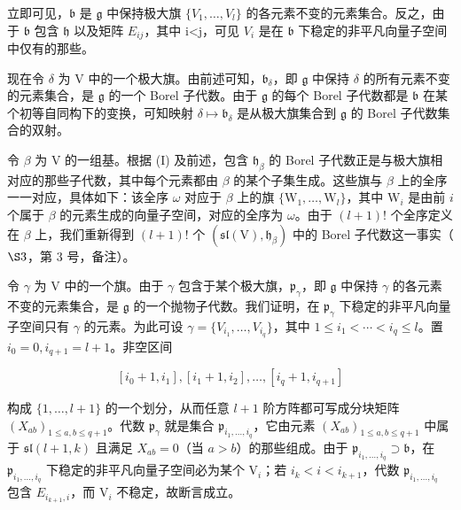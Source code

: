 立即可见，\(\mathfrak{b}\) 是 \(\mathfrak{g}\) 中保持极大旗 \(\{V_{1},\ldots,V_{l}\}\) 的各元素不变的元素集合。反之，由于 \(\mathfrak{b}\) 包含 \(\mathfrak{h}\) 以及矩阵 \(E_{ij}\)，其中 i\textless j，可见 \(V_{i}\) 是在 \(\mathfrak{b}\) 下稳定的非平凡向量子空间中仅有的那些。

现在令 \(\delta\) 为 V 中的一个极大旗。由前述可知，\(\mathfrak{b}_{\delta}\)，即 \(\mathfrak{g}\) 中保持 \(\delta\) 的所有元素不变的元素集合，是 \(\mathfrak{g}\) 的一个 Borel 子代数。由于 \(\mathfrak{g}\) 的每个 Borel 子代数都是 \(\mathfrak{b}\) 在某个初等自同构下的变换，可知映射 \(\delta \mapsto \mathfrak{b}_{\delta}\) 是从极大旗集合到 \(\mathfrak{g}\) 的 Borel 子代数集合的双射。

令 \(\beta\) 为 V 的一组基。根据 (I) 及前述，包含 \(\mathfrak{h}_{\beta}\) 的 Borel 子代数正是与极大旗相对应的那些子代数，其中每个元素都由 \(\beta\) 的某个子集生成。这些旗与 \(\beta\) 上的全序一一对应，具体如下：该全序 \(\omega\) 对应于 \(\beta\) 上的旗 \(\{\mathrm{W}_1,\dots ,\mathrm{W}_l\}\)，其中 \(\mathrm{W}_i\) 是由前 \(i\) 个属于 \(\beta\) 的元素生成的向量子空间，对应的全序为 \(\omega\)。由于 \((l + 1)!\) 个全序定义在 \(\beta\) 上，我们重新得到 \((l + 1)!\) 个 \((\mathfrak{sl}(\mathrm{V}),\mathfrak{h}_{\beta})\) 中的 Borel 子代数这一事实（\(\S 3\)，第 3 号，备注）。

令 \(\gamma\) 为 V 中的一个旗。由于 \(\gamma\) 包含于某个极大旗，\(\mathfrak{p}_{\gamma}\)，即 \(\mathfrak{g}\) 中保持 \(\gamma\) 的各元素不变的元素集合，是 \(\mathfrak{g}\) 的一个抛物子代数。我们证明，在 \(\mathfrak{p}_{\gamma}\) 下稳定的非平凡向量子空间只有 \(\gamma\) 的元素。为此可设 \(\gamma = \{V_{i_1}, \ldots, V_{i_q}\}\)，其中 \(1 \leq i_1 < \cdots < i_q \leq l\)。置 \(i_0 = 0, i_{q+1} = l + 1\)。非空区间

\[
\left[ i _ {0} + 1, i _ {1} \right], \left[ i _ {1} + 1, i _ {2} \right], \dots , \left[ i _ {q} + 1, i _ {q + 1} \right]
\]

构成 \(\{1, \ldots, l + 1\}\) 的一个划分，从而任意 \(l + 1\) 阶方阵都可写成分块矩阵 \((X_{ab})_{1 \leq a, b \leq q + 1}\)。代数 \(\mathfrak{p}_{\gamma}\) 就是集合 \(\mathfrak{p}_{i_1,\dots,i_q}\)，它由元素 \((X_{ab})_{1\leq a,b\leq q + 1}\) 中属于 \(\mathfrak{sl}(l + 1,k)\) 且满足 \(X_{ab} = 0\)（当 \(a > b\)）的那些组成。由于 \(\mathfrak{p}_{i_1,\dots,i_q}\supset \mathfrak{b}\)，在 \(\mathfrak{p}_{i_1,\dots,i_q}\) 下稳定的非平凡向量子空间必为某个 \(\mathrm{V}_i\)；若 \(i_k < i < i_{k + 1}\)，代数 \(\mathfrak{p}_{i_1,\dots,i_q}\) 包含 \(E_{i_{k + 1},i}\)，而 \(\mathrm{V}_i\) 不稳定，故断言成立。

